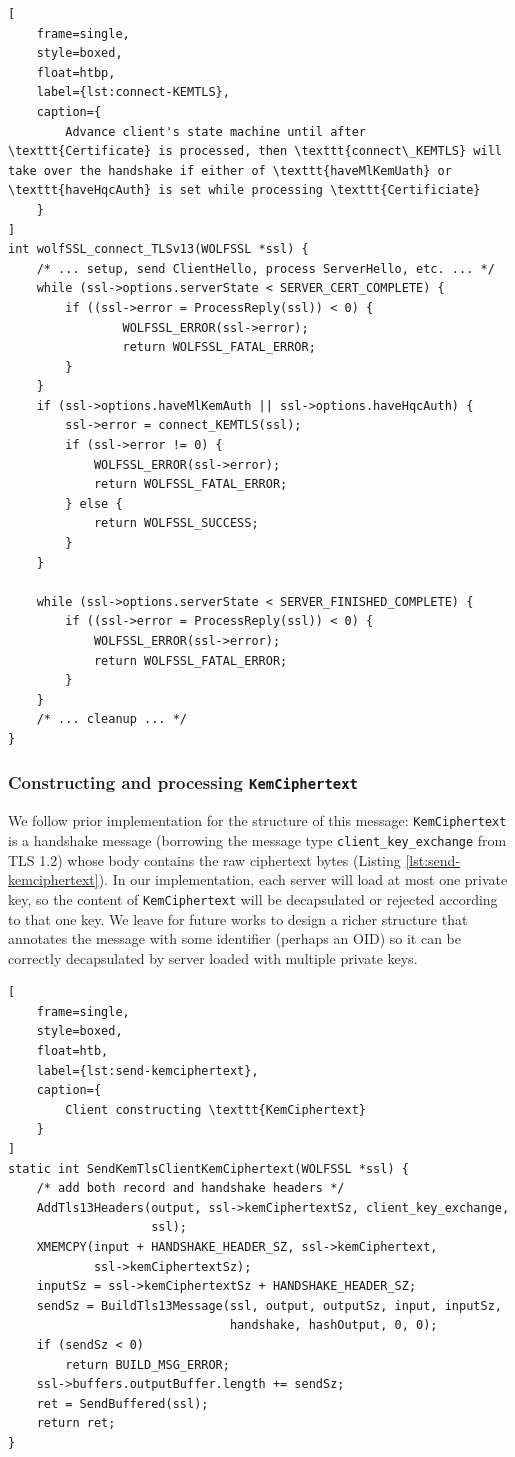 \documentclass[letterpaper,12pt,titlepage,oneside,final]{book}
\begin{document}
\begin{lstlisting}[
    frame=single, 
    style=boxed, 
    float=htbp,
    label={lst:connect-KEMTLS}, 
    caption={
        Advance client's state machine until after \texttt{Certificate} is processed, then \texttt{connect\_KEMTLS} will take over the handshake if either of \texttt{haveMlKemUath} or \texttt{haveHqcAuth} is set while processing \texttt{Certificiate}
    }
]
int wolfSSL_connect_TLSv13(WOLFSSL *ssl) {
    /* ... setup, send ClientHello, process ServerHello, etc. ... */
    while (ssl->options.serverState < SERVER_CERT_COMPLETE) {
        if ((ssl->error = ProcessReply(ssl)) < 0) {
                WOLFSSL_ERROR(ssl->error);
                return WOLFSSL_FATAL_ERROR;
        }
    }
    if (ssl->options.haveMlKemAuth || ssl->options.haveHqcAuth) {
        ssl->error = connect_KEMTLS(ssl);
        if (ssl->error != 0) {
            WOLFSSL_ERROR(ssl->error);
            return WOLFSSL_FATAL_ERROR;
        } else {
            return WOLFSSL_SUCCESS;
        }
    }

    while (ssl->options.serverState < SERVER_FINISHED_COMPLETE) {
        if ((ssl->error = ProcessReply(ssl)) < 0) {
            WOLFSSL_ERROR(ssl->error);
            return WOLFSSL_FATAL_ERROR;
        }
    }
    /* ... cleanup ... */
}
\end{lstlisting}

\subsubsection{Constructing and processing \texttt{KemCiphertext}}\label{sec:handling-kemciphertext}
We follow prior implementation \cite{DBLP:conf/latincrypt/CeliFSTVWWW21,DBLP:conf/space/GonzalezW22} for the structure of this message: \texttt{KemCiphertext} is a handshake message (borrowing the message type \texttt{client\_key\_exchange} from TLS 1.2) whose body contains the raw ciphertext bytes (Listing \ref{lst:send-kemciphertext}).
In our implementation, each server will load at most one private key, so the content of \texttt{KemCiphertext} will be decapsulated or rejected according to that one key.
We leave for future works to design a richer structure that annotates the message with some identifier (perhaps an OID) so it can be correctly decapsulated by server loaded with multiple private keys.

\begin{lstlisting}[
    frame=single, 
    style=boxed, 
    float=htb,
    label={lst:send-kemciphertext}, 
    caption={
        Client constructing \texttt{KemCiphertext}
    }
]
static int SendKemTlsClientKemCiphertext(WOLFSSL *ssl) {
    /* add both record and handshake headers */
    AddTls13Headers(output, ssl->kemCiphertextSz, client_key_exchange, 
                    ssl);
    XMEMCPY(input + HANDSHAKE_HEADER_SZ, ssl->kemCiphertext,
            ssl->kemCiphertextSz);
    inputSz = ssl->kemCiphertextSz + HANDSHAKE_HEADER_SZ;
    sendSz = BuildTls13Message(ssl, output, outputSz, input, inputSz,
                               handshake, hashOutput, 0, 0);
    if (sendSz < 0)
        return BUILD_MSG_ERROR;
    ssl->buffers.outputBuffer.length += sendSz;
    ret = SendBuffered(ssl);
    return ret;
}
\end{lstlisting}
\end{document}
